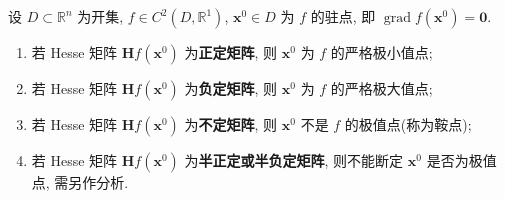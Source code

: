 \begin{theorem}[极值的充分条件]\label{thm:9.2.2}
设 $D \subset \mathbb{R}^{n}$ 为开集, $f \in C^{2}(D, \mathbb{R}^{1})$, $\boldsymbol{x}^{0} \in D$ 为 $f$ 的驻点, 即 $\operatorname{grad}f(\boldsymbol{x}^{0}) = \boldsymbol{0}$.
\begin{enumerate}
  \item 若 Hesse 矩阵 $\boldsymbol{H}f(\boldsymbol{x}^{0})$ 为\textbf{正定矩阵}, 则 $\boldsymbol{x}^{0}$ 为 $f$ 的严格极小值点;
  \item 若 Hesse 矩阵 $\boldsymbol{H}f(\boldsymbol{x}^{0})$ 为\textbf{负定矩阵}, 则 $\boldsymbol{x}^{0}$ 为 $f$ 的严格极大值点;
  \item 若 Hesse 矩阵 $\boldsymbol{H}f(\boldsymbol{x}^{0})$ 为\textbf{不定矩阵}, 则 $\boldsymbol{x}^{0}$ 不是 $f$ 的极值点(称为鞍点);
  \item 若 Hesse 矩阵 $\boldsymbol{H}f(\boldsymbol{x}^{0})$ 为\textbf{半正定或半负定矩阵}, 则不能断定 $\boldsymbol{x}^{0}$ 是否为极值点, 需另作分析.
\end{enumerate}
\end{theorem}

